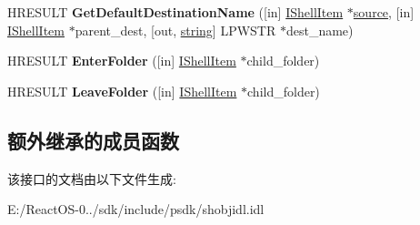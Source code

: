 \begin{DoxyCompactItemize}
\item 
\mbox{\label{interface_i_transfer_source_af34b90e93958b009ae73b76ab170e66a}} 
H\+R\+E\+S\+U\+LT {\bfseries Get\+Default\+Destination\+Name} (\mbox{[}in\mbox{]} \hyperlink{interface_i_shell_item}{I\+Shell\+Item} $\ast$\hyperlink{structsource}{source}, \mbox{[}in\mbox{]} \hyperlink{interface_i_shell_item}{I\+Shell\+Item} $\ast$parent\+\_\+dest, \mbox{[}out, \hyperlink{structstring}{string}\mbox{]} L\+P\+W\+S\+TR $\ast$dest\+\_\+name)
\item 
\mbox{\label{interface_i_transfer_source_ad5c94b3ee50f1bad04e2e66484dc912e}} 
H\+R\+E\+S\+U\+LT {\bfseries Enter\+Folder} (\mbox{[}in\mbox{]} \hyperlink{interface_i_shell_item}{I\+Shell\+Item} $\ast$child\+\_\+folder)
\item 
\mbox{\label{interface_i_transfer_source_ad6ef36dda63841956eb7dbb0fcaea546}} 
H\+R\+E\+S\+U\+LT {\bfseries Leave\+Folder} (\mbox{[}in\mbox{]} \hyperlink{interface_i_shell_item}{I\+Shell\+Item} $\ast$child\+\_\+folder)
\end{DoxyCompactItemize}
\subsection*{额外继承的成员函数}


该接口的文档由以下文件生成\+:\begin{DoxyCompactItemize}
\item 
E\+:/\+React\+O\+S-\/0../sdk/include/psdk/shobjidl.\+idl\end{DoxyCompactItemize}
